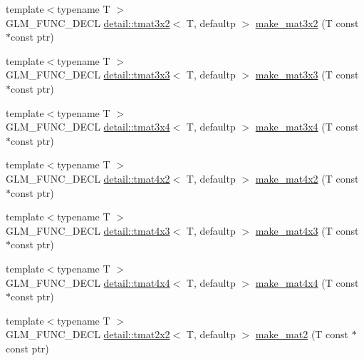 \begin{DoxyCompactItemize}
\item 
{\footnotesize template$<$typename T $>$ }\\G\+L\+M\+\_\+\+F\+U\+N\+C\+\_\+\+D\+E\+CL \hyperlink{structglm_1_1detail_1_1tmat3x2}{detail\+::tmat3x2}$<$ T, defaultp $>$ \hyperlink{group__gtc__type__ptr_gaa40868af4de8c5ed5470fdcc9985dbfc}{make\+\_\+mat3x2} (T const $\ast$const ptr)
\item 
{\footnotesize template$<$typename T $>$ }\\G\+L\+M\+\_\+\+F\+U\+N\+C\+\_\+\+D\+E\+CL \hyperlink{structglm_1_1detail_1_1tmat3x3}{detail\+::tmat3x3}$<$ T, defaultp $>$ \hyperlink{group__gtc__type__ptr_gaf8ba0a0a523423ae1149a1c2d90eb337}{make\+\_\+mat3x3} (T const $\ast$const ptr)
\item 
{\footnotesize template$<$typename T $>$ }\\G\+L\+M\+\_\+\+F\+U\+N\+C\+\_\+\+D\+E\+CL \hyperlink{structglm_1_1detail_1_1tmat3x4}{detail\+::tmat3x4}$<$ T, defaultp $>$ \hyperlink{group__gtc__type__ptr_gaa0c07ac459a5e16374aa12e3b35ee043}{make\+\_\+mat3x4} (T const $\ast$const ptr)
\item 
{\footnotesize template$<$typename T $>$ }\\G\+L\+M\+\_\+\+F\+U\+N\+C\+\_\+\+D\+E\+CL \hyperlink{structglm_1_1detail_1_1tmat4x2}{detail\+::tmat4x2}$<$ T, defaultp $>$ \hyperlink{group__gtc__type__ptr_gae4ad99adfe4fb195a192712a71de901d}{make\+\_\+mat4x2} (T const $\ast$const ptr)
\item 
{\footnotesize template$<$typename T $>$ }\\G\+L\+M\+\_\+\+F\+U\+N\+C\+\_\+\+D\+E\+CL \hyperlink{structglm_1_1detail_1_1tmat4x3}{detail\+::tmat4x3}$<$ T, defaultp $>$ \hyperlink{group__gtc__type__ptr_ga37ec66362c22d86ad2ee11930b638c4a}{make\+\_\+mat4x3} (T const $\ast$const ptr)
\item 
{\footnotesize template$<$typename T $>$ }\\G\+L\+M\+\_\+\+F\+U\+N\+C\+\_\+\+D\+E\+CL \hyperlink{structglm_1_1detail_1_1tmat4x4}{detail\+::tmat4x4}$<$ T, defaultp $>$ \hyperlink{group__gtc__type__ptr_ga4b13ff6840a66d032724a9a1db50f704}{make\+\_\+mat4x4} (T const $\ast$const ptr)
\item 
{\footnotesize template$<$typename T $>$ }\\G\+L\+M\+\_\+\+F\+U\+N\+C\+\_\+\+D\+E\+CL \hyperlink{structglm_1_1detail_1_1tmat2x2}{detail\+::tmat2x2}$<$ T, defaultp $>$ \hyperlink{group__gtc__type__ptr_ga903422b2c346cbaccad3153a5a1f404c}{make\+\_\+mat2} (T const $\ast$const ptr)
\item 

\end{DoxyCompactItemize}
